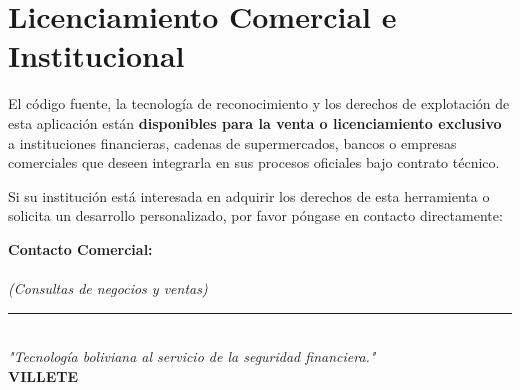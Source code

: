 \documentclass[11pt,a4paper]{article}
\begin{document}
\vspace*{1.5cm}

\section*{Licenciamiento Comercial e Institucional}
El código fuente, la tecnología de reconocimiento y los derechos de explotación de esta aplicación están \textbf{disponibles para la venta o licenciamiento exclusivo} a instituciones financieras, cadenas de supermercados, bancos o empresas comerciales que deseen integrarla en sus procesos oficiales bajo contrato técnico.

Si su institución está interesada en adquirir los derechos de esta herramienta o solicita un desarrollo personalizado, por favor póngase en contacto directamente:

\begin{center}
    \begin{tcolorbox}[colback=primaryDark!5, colframe=primaryDark, arc=10pt, width=0.7\textwidth, halign=center]
        \textbf{\large Contacto Comercial:} \\
         \\
        \textit{(Consultas de negocios y ventas)}
    \end{tcolorbox}
\end{center}

\vspace*{1cm}
\begin{center}
    \textcolor{primaryDark}{\rule{0.3\textwidth}{1pt}} \\
    \textit{"Tecnología boliviana al servicio de la seguridad financiera."} \\
    \textbf{VILLETE}
\end{center}
\end{document}
